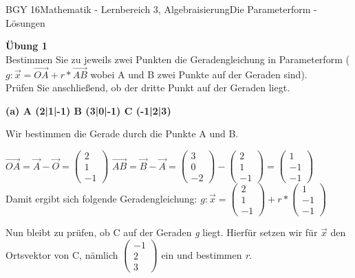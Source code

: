 \documentclass[oneside,openany,headings=optiontotoc,11pt,numbers=noenddot]{scrreprt}
\begin{document}
	\begin{worksheet}{BGY 16}{Mathematik - Lernbereich 3, Algebraisierung}{Die Parameterform - Lösungen}
				
		\begin{framed}
			\noindent
			\tiny{\color{codegray}\textbf{Übung 1}\\Bestimmen Sie zu jeweils zwei Punkten die Geradengleichung in Parameterform (\(g: \vec{x} = \overrightarrow{OA} + r*\overrightarrow{AB}\) wobei A und B zwei Punkte auf der Geraden sind).\\
			Prüfen Sie anschließend, ob der dritte Punkt auf der Geraden liegt.}
			\normalsize
			\par\bigskip
			\textbf{(a) A (2|1|-1) B (3|0|-1) C (-1|2|3)}\\
			\par\noindent
			Wir bestimmen die Gerade durch die Punkte A und B.\\
			\par\noindent
			\(\overrightarrow{OA} = \vec{A} -\vec{O} = \left(\begin{array}{c}2 \\ 1 \\ -1\end{array}\right)\) \(\overrightarrow{AB} = \vec{B} -\vec{A} = \left(\begin{array}{c}3 \\ 0 \\ -2\end{array}\right) - \left(\begin{array}{c}2 \\ 1 \\ -1\end{array}\right) = \left(\begin{array}{c}1 \\ -1 \\ -1\end{array}\right)\)\\
			Damit ergibt sich folgende Geradengleichung: \(g: \vec{x} = \left(\begin{array}{c}2 \\ 1 \\ -1\end{array}\right) + r*\left(\begin{array}{c}1\\-1\\-1\end{array}\right)\)\\
			\par\noindent
			Nun bleibt zu prüfen, ob C auf der Geraden \textit{g} liegt. Hierfür setzen wir für \(\vec{x}\)	den Ortsvektor von C, nämlich \(\left(\begin{array}{c}-1\\2\\3\end{array}\right)\) ein und bestimmen \textit{r}.\\

\end{framed}
\end{worksheet}
\end{document}
